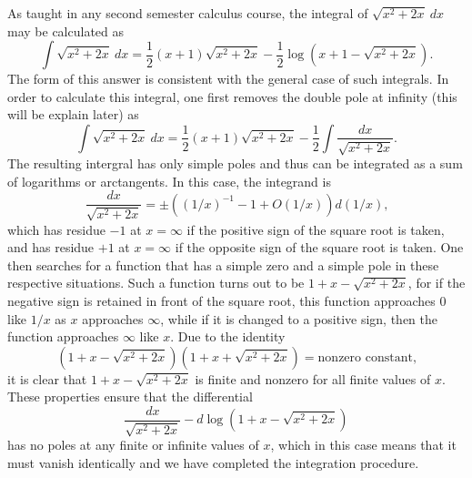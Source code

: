 \documentclass[12pt,reqno]{amsart}
\numberwithin{equation}{section}
\begin{document}
As taught in any second semester calculus course, the integral of $\sqrt{x^2+2x} \ dx$ may be calculated as
\begin{equation*}
\int \sqrt{x^2+2x} \ dx =  \frac{1}{2} (x+1) \sqrt{x^2+2 x} - \frac{1}{2} \log (x+1-\sqrt{x^2+2 x})\text{.}
\end{equation*}
The form of this answer is consistent with the general case of such integrals. In order to calculate this integral, one first removes the double pole at infinity (this will be explain later) as
\begin{equation}
\label{equ_hr1}
 \int \sqrt{x^2+2x} \ dx =  \frac{1}{2} (x+1) \sqrt{x^2+2 x} - \frac{1}{2} \int \frac{dx}{\sqrt{x^2+2x}}\text{.}
\end{equation}
The resulting intergral has only simple poles and thus can be integrated as a sum of logarithms or arctangents. In this case, the integrand is
\begin{equation*}
\frac{dx}{\sqrt{x^2+2x}} = \pm \left( (1/x)^{-1} - 1 + O(1/x) \right) d(1/x)\text{,}
\end{equation*}
which has residue $-1$ at $x=\infty$ if the positive sign of the square root is taken, and has residue $+1$ at $x=\infty$ if the opposite sign of the square root is taken. One then searches for a function that has a simple zero and a simple pole in these respective situations. Such a function turns out to be $1+x-\sqrt{x^2+2x}$, for if the negative sign is retained in front of the square root, this function approaches $0$ like $1/x$ as $x$ approaches $\infty$, while if it is changed to a positive sign, then the function approaches $\infty$ like $x$. Due to the identity
\begin{equation}
\label{equ_pell1}
 (1+x-\sqrt{x^2+2x})(1+x+\sqrt{x^2+2x}) = \text{nonzero constant,}
\end{equation}
it is clear that $1+x-\sqrt{x^2+2x}$ is finite and nonzero for all finite values of $x$. These properties ensure that the differential
\begin{equation}
\label{equ_log1}
 \frac{dx}{\sqrt{x^2+2x}}-d \log(1+x-\sqrt{x^2+2x})
\end{equation}
has no poles at any finite or infinite values of $x$, which in this case means that it must vanish identically and we have completed the integration procedure.
\end{document}
